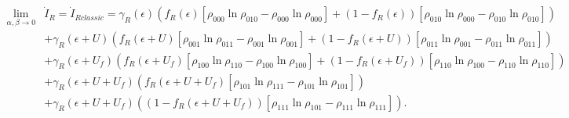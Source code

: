 \begin{appendixs}
\begin{align*}
 \lim_{\alpha,\beta \to 0}  & \dot{I}_{R}  = \dot{I}_{Rclassic}   =  \gamma_{R}(\epsilon)(f_{R}(\epsilon)[\rho_{000}\ln \rho_{010} - \rho_{000}\ln \rho_{000}] + (1-f_{R}(\epsilon))[\rho_{010}\ln \rho_{000} - \rho_{010}\ln \rho_{010} ] )  \\ 
      & + \gamma_{R}(\epsilon + U)(f_{R}(\epsilon + U)[\rho_{001}\ln \rho_{011} - \rho_{001}\ln \rho_{001}] + (1-f_{R}(\epsilon + U))[\rho_{011}\ln \rho_{001} -\rho_{011}\ln \rho_{011} ]   ) \\  
      & + \gamma_{R}(\epsilon + U_{f})( f_{R}(\epsilon + U_{f})[\rho_{100}\ln \rho_{110} -\rho_{100}\ln \rho_{100} ]  + (1-f_{R}(\epsilon + U_{f}))[\rho_{110}\ln \rho_{100} - \rho_{110}\ln \rho_{110} ] ) \\  
      & + \gamma_{R}(\epsilon + U + U_{f})( f_{R}(\epsilon + U + U_{f})[\rho_{101}\ln \rho_{111}- \rho_{101}\ln \rho_{101}]) \\   
      & + \gamma_{R}(\epsilon + U + U_{f})( (1-f_{R}(\epsilon+U+U_{f}) )[\rho_{111}\ln \rho_{101} - \rho_{111}\ln \rho_{111}]).   
\end{align*}

\label{apendix5infoflow}

\end{appendixs}